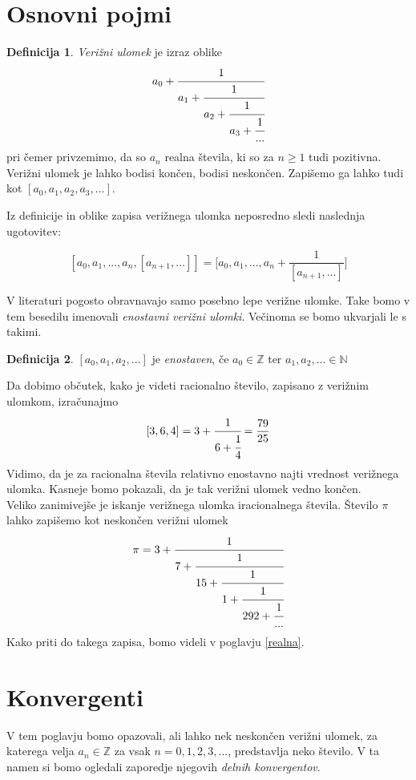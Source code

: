 \documentclass[a4paper,12pt]{article}
\newcommand{\N}{\mathbb{N}}
\newcommand{\Z}{\mathbb{Z}}
\theoremstyle{definition}
\newtheorem{df}{Definicija}[section]
\theoremstyle{proposition}
\theoremstyle{theorem}
\theoremstyle{lemma}
\begin{document}
\section{Osnovni pojmi} \label{ospojmi}

\begin{df}
	\textit{Verižni ulomek} je izraz oblike
	\[ a_0 + \cfrac{1}{a_1 + \cfrac{1}{a_2 + \cfrac{1}{a_3 + \cfrac{1}{...}}}} \]
	pri čemer privzemimo, da so $a_n$ realna števila, ki so za $n \geq 1$ tudi pozitivna. Verižni ulomek je lahko bodisi končen, bodisi neskončen.
	\newline
	\newline
	Zapišemo ga lahko tudi kot $[a_0, a_1, a_2, a_3, ...]$.
\end{df}
	
Iz definicije in oblike zapisa verižnega ulomka neposredno sledi naslednja ugotovitev:

\begin{equation}
\label{ocitno}
[a_0, a_1, ..., a_n, [a_{n+1}, ...]]=\Bigg[ a_0, a_1, ..., a_n+\frac{1}{[a_{n+1}, ...]}\Bigg]
\end{equation}

V literaturi pogosto obravnavajo samo posebno lepe verižne ulomke. Take bomo v tem besedilu imenovali \textit{enostavni verižni ulomki}. Večinoma se bomo ukvarjali le s takimi.

\begin{df}
	$[a_0, a_1, a_2, ...]$ je \textit{enostaven}, če $a_0 \in \Z$ ter $a_1, a_2, ... \in \N$
\end{df}

Da dobimo občutek, kako je videti racionalno število, zapisano z verižnim ulomkom, izračunajmo \[ [3,6,4] = 3 + \cfrac{1}{6+\cfrac{1}{4}} = \frac{79}{25}\]
Vidimo, da je za racionalna števila relativno enostavno najti vrednost verižnega ulomka. Kasneje bomo pokazali, da je tak verižni ulomek vedno končen.\\ Veliko zanimivejše je iskanje verižnega ulomka iracionalnega števila. Število $\pi$ lahko zapišemo kot neskončen verižni ulomek \[ \pi = 3 + \cfrac{1}{7 + \cfrac{1}{15 + \cfrac{1}{1 + \cfrac{1}{292 + \cfrac{1}{...}}}}} \]
Kako priti do takega zapisa, bomo videli v poglavju \ref{realna}.

\section{Konvergenti} \label{konv}

V tem poglavju bomo opazovali, ali lahko nek neskončen verižni ulomek, za katerega velja $a_n \in \Z$ za vsak $n = 0, 1, 2, 3, ...$, predstavlja neko število. V ta namen si bomo ogledali zaporedje njegovih \textit{delnih konvergentov}.
\end{document}
